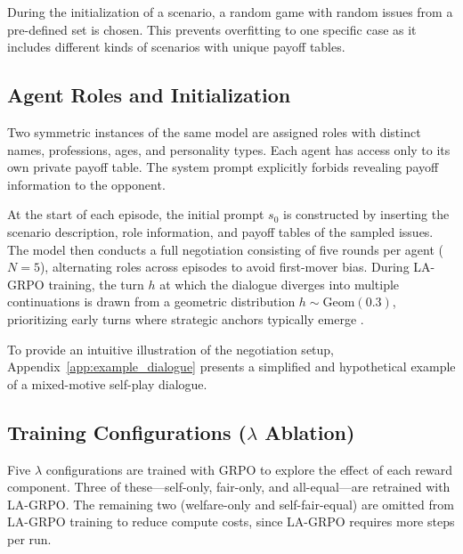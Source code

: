 \documentclass[12pt,a4paper]{article}
\begin{document}
During the initialization of a scenario, a random game with random issues from a pre-defined set is chosen. This prevents overfitting to one specific case as it includes different kinds of scenarios with unique payoff tables.


\subsection{Agent Roles and Initialization}

Two symmetric instances of the same model are assigned roles with distinct names, professions, ages, and personality types. Each agent has access only to its own private payoff table. The system prompt explicitly forbids revealing payoff information to the opponent.

At the start of each episode, the initial prompt $s_0$ is constructed by inserting the scenario description, role information, and payoff tables of the sampled issues. The model then conducts a full negotiation consisting of five rounds per agent ($N=5$), alternating roles across episodes to avoid first-mover bias. During LA-GRPO training, the turn $h$ at which the dialogue diverges into multiple continuations is drawn from a geometric distribution $h \sim \mathrm{Geom}(0.3)$, prioritizing early turns where strategic anchors typically emerge \citep{franceschetti2025advantage}.

To provide an intuitive illustration of the negotiation setup, Appendix~\ref{app:example_dialogue} presents a simplified and hypothetical example of a mixed-motive self-play dialogue.


\subsection{Training Configurations ($\lambda$ Ablation)}

Five $\lambda$ configurations are trained with GRPO to explore the effect of each reward component. Three of these---self-only, fair-only, and all-equal---are retrained with LA-GRPO. The remaining two (welfare-only and self-fair-equal) are omitted from LA-GRPO training to reduce compute costs, since LA-GRPO requires more steps per run.
\end{document}
